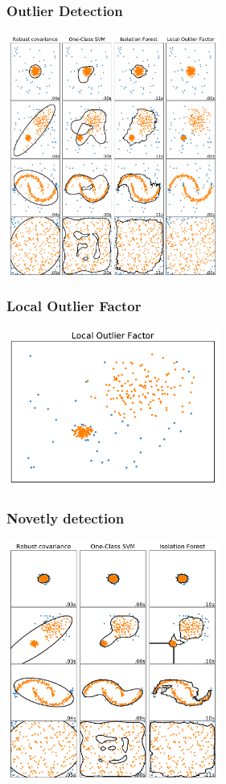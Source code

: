 \documentclass[slidetop,11pt]{beamer}
\begin{document}
\begin{frame}[plain]\frametitle{Outlier Detection}
    
\begin{center}
\includegraphics[width=7cm]{img/anomaly_comparison.pdf}
\end{center}

\end{frame}


\begin{frame}[plain]\frametitle{Local Outlier Factor}

\begin{center}
\includegraphics[width=7cm]{img/locality_lof.pdf}
\end{center}

\end{frame}


\begin{frame}[plain]\frametitle{Novetly detection}
    
\begin{center}
\includegraphics[width=7cm]{img/novelty_comparison.pdf}
\end{center}

\end{frame}
\end{document}
